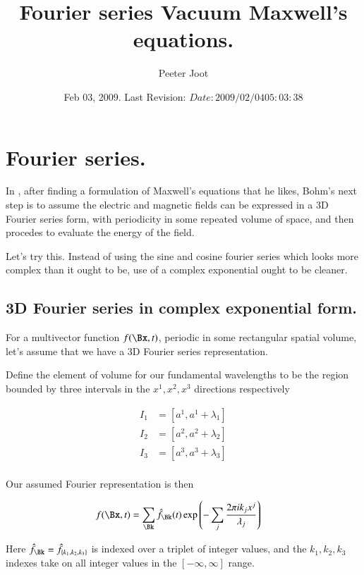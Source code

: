 \documentclass{article}
\title{ Fourier series Vacuum Maxwell's equations. }
\author{Peeter Joot}
\date{ Feb 03, 2009.  Last Revision: $Date: 2009/02/04 05:03:38 $ }
\begin{document}
\maketitle{}

\tableofcontents

\section{ Fourier series. }

In \cite{bohm1989qt}, 
after finding a formulation of Maxwell's equations that he likes, Bohm's next
step is to assume the electric and magnetic fields can be expressed in 
a 3D Fourier series form, with periodicity in some repeated volume 
of space, and then procedes to evaluate the energy of the 
field.

Let's try this.  Instead of using the sine and cosine fourier series
which looks more complex than it ought to be, use of a complex exponential
ought to be cleaner.

\subsection{ 3D Fourier series in complex exponential form. }

For a multivector function $f(\Bx, t)$, periodic in some rectangular spatial volume, let's assume that we have a
3D Fourier series representation.

Define the element of volume for our fundamental wavelengths to be the region bounded by three intervals in the $x^1, x^2, x^3$ directions respectively

\begin{align*}
I_1 &= [ a^1, a^1 + \lambda_1 ] \\
I_2 &= [ a^2, a^2 + \lambda_2 ] \\
I_3 &= [ a^3, a^3 + \lambda_3 ] \\
\end{align*}

Our assumed Fourier representation is then

\begin{align*}
f(\Bx, t) &= \sum_{\Bk} \hat{f}_{\Bk}(t) \exp\left( - \sum_j \frac{2 \pi i k_j x^j}{\lambda_j} \right)
\end{align*}

Here $\hat{f}_{\Bk} = \hat{f}_{\{k_1, k_2, k_3\}}$ is indexed over a triplet of integer values, and the $k_1, k_2, k_3$ indexes take on all integer values in the $[-\infty, \infty]$ range.
\end{document}
